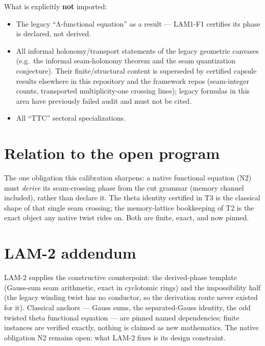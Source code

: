 What is explicitly \textbf{not} imported:

\begin{itemize}
\tightlist
\item
  The legacy ``Λ-functional equation'' as a result --- LAM1-F1 certifies its
  phase is declared, not derived.
\item
  All informal holonomy/transport statements of the legacy geometric
  canvases (e.g.~the informal seam-holonomy theorem and the seam
  quantization conjecture). Their finite/structural content is
  superseded by certified capsule results elsewhere in this repository
  and the framework repos (seam-integer counts, transported
  multiplicity-one crossing lines); legacy formulas in this area have
  previously failed audit and must not be cited.
\item
  All ``TTC'' sectoral specializations.
\end{itemize}

\hypertarget{relation-to-the-open-program}{%
\section{Relation to the open program}\label{relation-to-the-open-program}}

The one obligation this calibration sharpens: a native functional
equation (N2) must \emph{derive} its seam-crossing phase from the cut
grammar (memory channel included), rather than declare it. The theta
identity certified in T3 is the classical shape of that single seam
crossing; the memory-lattice bookkeeping of T2 is the exact object any
native twist rides on. Both are finite, exact, and now pinned.

\hypertarget{lam-2-addendum}{%
\section{LAM-2 addendum}\label{lam-2-addendum}}

LAM-2 supplies the constructive counterpoint: the derived-phase template
(Gauss-sum seam arithmetic, exact in cyclotomic rings) and the
impossibility half (the legacy winding twist has no conductor, so the
derivation route never existed for it). Classical anchors --- Gauss sums,
the separated-Gauss identity, the odd twisted theta functional
equation --- are pinned named dependencies; finite instances are verified
exactly, nothing is claimed as new mathematics. The native obligation
N2 remains open: what LAM-2 fixes is its design constraint.

